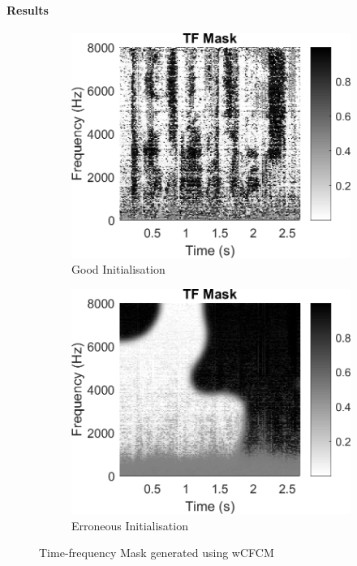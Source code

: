 \documentclass[a4paper,twoside,12pt,hidelinks]{article}
\begin{document}
\paragraph{Results}
\begin{figure}[H]
\centering
\begin{subfigure}[H]{0.49\textwidth}
\includegraphics[width=\textwidth]{maskwCFCM}
\caption{Good Initialisation}
\label{fig:goodinit}
\end{subfigure}
\begin{subfigure}[H]{0.49\textwidth}
\includegraphics[width=\textwidth]{maskwCFCMfail}
\caption{Erroneous Initialisation}
\label{fig:errorinit}
\end{subfigure}
\caption{Time-frequency Mask generated using wCFCM}
\label{fig:wcfcm}
\end{figure}
\end{document}
